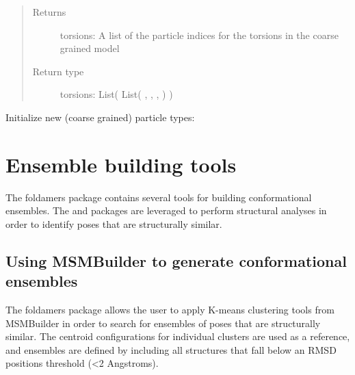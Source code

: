 \documentclass[letterpaper,12pt,english,openany,oneside]{sphinxmanual}
\begin{document}
\begin{fulllineitems}
\begin{fulllineitems}
\begin{quote}
\begin{description}
\item[{Returns}] \leavevmode
torsions: A list of the particle indices for the torsions in the coarse grained model

\item[{Return type}] \leavevmode
torsions: List( List( , , ,  ) )

\end{description}\end{quote}

\end{fulllineitems}


\begin{fulllineitems}
\label{\detokenize{cg_model:cg_model.cgmodel.CGModel.nonbonded_interaction_list}}
Initialize new (coarse grained) particle types:

\end{fulllineitems}


\end{fulllineitems}



\chapter{Ensemble building tools}
\label{\detokenize{ensembles:ensemble-building-tools}}\label{\detokenize{ensembles::doc}}
The foldamers package contains several tools for building conformational ensembles.  The  and  packages are leveraged to perform structural analyses in order to identify poses that are structurally similar.


\section{Using MSMBuilder to generate conformational ensembles}
\label{\detokenize{ensembles:using-msmbuilder-to-generate-conformational-ensembles}}
The foldamers package allows the user to apply K-means clustering tools from MSMBuilder in order to search for ensembles of poses that are structurally similar.  The centroid configurations for individual clusters are used as a reference, and ensembles are defined by including all structures that fall below an RMSD positions threshold (\textless{}2 Angstroms).
\end{document}
